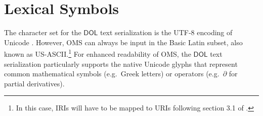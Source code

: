 \documentclass[10pt,fleqn,final]{scrreprt}
\makeatletter
\newcommand*\CommentAuthor{}
\renewcommand*\CommentAuthor{#1}}
\newcommand*\CommentDate{}
\renewcommand*\CommentDate{#1}}
\newcommand*\CommentId{}
\renewcommand*\CommentId{#1}}
\newcommand*\CommentType{}
\renewcommand*\CommentType{#1}}
\newcommand*{\SetCommentColorByType}[1]{%
\edef\localType{{#1}}%
\expandafter\ifstrequal\localType{q-aut}{\colorlet{CommentColor}{red}}{%
\expandafter\ifstrequal\localType{q-all}{\colorlet{CommentColor}{orange}}{%
\expandafter\ifstrequal\localType{todo}{\colorlet{CommentColor}{orange}}{%
\expandafter\ifstrequal\localType{fyi}{\colorlet{CommentColor}{lightgray}}{%
\colorlet{CommentColor}{yellow}}}}}}
\newcommand*{\SetCommentPrefixByType}[1]{%
\edef\localType{{#1}}%
\expandafter\@ifmtarg\localType{%
\edef\CommentPrefix{}%
}{%
\caseupper[q]{#1}%
\edef\CommentPrefix{\thestring: }%
}}
\newcommand*{\initComment}[1]{%
\setkeys{Comment}{#1}%
\SetCommentColorByType{\CommentType}%
\relax%
\SetCommentPrefixByType{\CommentType}%
\relax%
}
\newcommand*{\todonote}[2][]{%
\initComment{#1}%
\pdfcomment[author=\CommentAuthor,color=CommentColor,date=\CommentDate,id=\CommentId]{%
\CommentPrefix
#2}}
\renewcommand*{\todonote}[2][]{%
\initComment{#1}%
\ednote{\CommentPrefix #2}}
\newcommand*{\syntax}[1]{\texttt{#1}}
\newcommand*{\notallowed}{\textbf{not allowed}\xspace}
\newcommand*{\DOL}{\ensuremath{\mathsf{DOL}}\xspace}
\newcommand{\noterefname}{note}
\newcommand{\nref}[1]{\noterefname~\ref{#1}}
\newcommand{\sclause}[1]{\section{#1}}
\renewcommand{\nref}[1]{\ref{nref-#1}} %
\newenvironment{definitions}[0]{\medskip }{}
\providecommand{\DIFadd}[1]{{\protect\color{blue}\uwave{#1}}} %
\providecommand{\DIFaddbegin}{} %
\providecommand{\DIFaddend}{} %
\providecommand{\DIFdelbegin}{} %
\providecommand{\DIFdelend}{} %
\makeatother
\begin{document}
\begin{definitions}
%
%
%
%

\sclause{Lexical Symbols}

The character set for the \DOL text serialization is the UTF-8 encoding of Unicode \DIFdelbegin %
\DIFdelend \DIFaddbegin \DIFadd{\nref{UCS}}\DIFaddend .  However, OMS can always be input in the Basic Latin subset, also known as US-ASCII.\footnote{In this case, IRIs will have to be mapped to URIs following section 3.1 of \DIFdelbegin %
\DIFdelend \DIFaddbegin \DIFadd{\nref{IRI}}\DIFaddend .}  For enhanced readability of OMS, the \DOL text serialization particularly supports the native Unicode glyphs that represent common mathematical symbols (e.g.\ Greek letters)  or operators (e.g.\ $\partial$ for partial derivatives). %


\end{definitions}
\end{document}
